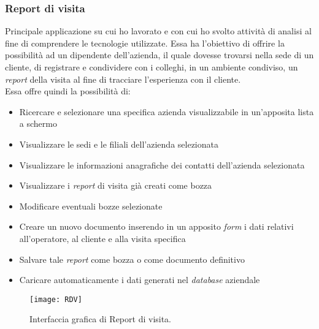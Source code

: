 \subsubsection*{Report di visita}
Principale applicazione su cui ho lavorato e con cui ho svolto attività di analisi al fine di comprendere le tecnologie utilizzate.
Essa ha l'obiettivo di offrire la possibilità ad un dipendente dell'azienda, il quale dovesse trovarsi nella sede di un cliente, di registrare e condividere con i colleghi, in un ambiente condiviso, un \emph{report} della visita al fine di tracciare l'esperienza con il cliente.\\
Essa offre quindi la possibilità di: 
\begin{itemize}
    \item Ricercare e selezionare una specifica azienda visualizzabile in un'apposita lista a schermo 
    \item Visualizzare le sedi e le filiali dell'azienda selezionata 
    \item Visualizzare le informazioni anagrafiche dei contatti dell'azienda selezionata  
    \item Visualizzare i \emph{report} di visita già creati come bozza  
    \item Modificare eventuali bozze selezionate 
    \item Creare un nuovo documento inserendo in un apposito \emph{form} i dati relativi all'operatore, al cliente e alla visita specifica 
    \item Salvare tale \emph{report} come bozza o come documento definitivo
    \item Caricare automaticamente i dati generati nel \emph{database} aziendale 
\end{itemize}
\begin{figure}[htbp] 
    \centering 
    \texttt{[image: RDV]} 
    \caption{Interfaccia grafica di Report di visita.}
    \label{fig:RDV}
\end{figure}

